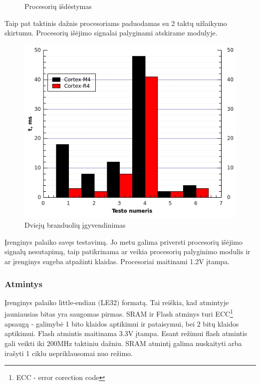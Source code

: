 \documentclass[a4paper, 12pt]{article} %
\begin{document}
\begin{onehalfspacing}
\begin{figure}[H]
\caption{Procesori\k{u} i\v{s}d\.estymas}
\label{vienas}
\end{figure}
Taip pat taktinis da\v{z}nis procesoriams paduodamas su 2 takt\k{u} u\v{z}laikymo skirtumu. 
Procesori\k{u} i\v{s}\.ejimo signalai palyginami atskirame modulyje.
\begin{figure}[H] %
\centering %
\includegraphics[scale=0.8]{pav/testai.jpg} %
\captionsetup{labelformat=numbfirst} %
\captionsetup{labelseparator=tarpas}
\caption{Dviej\k{u} branduoli\k{u} \k{i}gyvendinimas}
\label{vienas}
\end{figure}
\k{I}renginys palaiko sav\k{e}s testavim\k{a}. Jo metu galima priversti procesori\k{u} i\v{s}\.ejimo signal\k{u} nesutapim\k{a}, taip patikrinama ar veikia procesori\k{u} palyginimo modulis ir ar \k{i}renginys sugeba atpa\v{z}inti klaidas. Procesoriai maitinami 1.2V \k{i}tampa. 


\subsubsection{Atmintys}
\k{I}renginys palaiko little-endian $($LE32$)$ format\k{a}. Tai rei\v{s}kia, kad atmintyje jauniausias bitas yra saugomas pirmas.
SRAM ir Flash atminys turi ECC\footnote{ECC - error corection code} apsaug\k{a} - galimyb\.e 1 bito klaidos aptikimui ir pataisymui, bei 2 bit\k{u} klaidos aptikimui. Flash atmintis maitinama 3.3V \k{i}tampa. Esant %
re\v{z}imui flash atmintis gali veikti iki 200MHz taktiniu da\v{z}niu. SRAM atmint\k{i} galima nuskaityti arba ira\v{s}yti 1 ciklu nepriklausomai nuo re\v{z}imo.   



\end{onehalfspacing}
\end{document}
